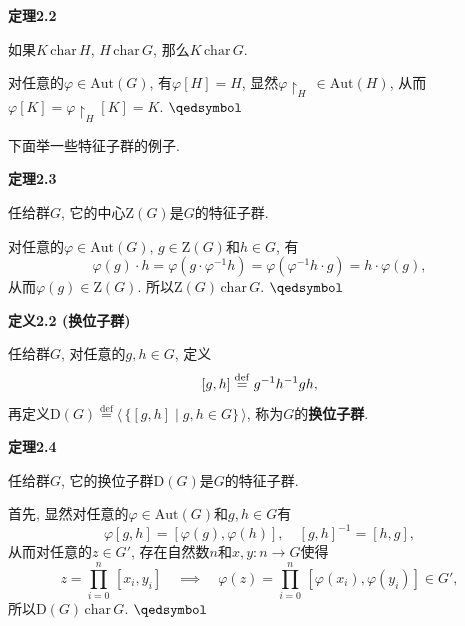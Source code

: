 \documentclass[UTF8]{ctexart}
\begin{document}
\vspace{10pt}

\hypertarget{sec:定理2.2}{}
\noindent\textbf{定理2.2}

如果$K\,\mathrm{char}\,H$, $H\,\mathrm{char}\,G$, 那么$K\,\mathrm{char}\,G$.


对任意的$\varphi\in\mathrm{Aut}(G)$, 有$\varphi[H]=H$,
显然$\varphi\!\restriction_{H}\,\in\mathrm{Aut}(H)$, 从而
$\varphi[K]=\varphi\!\restriction_{H}[K]=K$. \hfill $\qedsymbol$

\vspace{15pt}

下面举一些特征子群的例子.

\vspace{10pt}

\hypertarget{sec:定理2.3}{}
\noindent\textbf{定理2.3}

任给群$G$, 它的中心$\mathrm{Z}(G)$是$G$的特征子群.


对任意的$\varphi\in\mathrm{Aut}(G)$, $g\in\mathrm{Z}(G)$和$h\in G$, 有
\[
    \varphi(g)\cdot h=\varphi(g\cdot\varphi^{-1}h)=
    \varphi(\varphi^{-1}h\cdot g)=h\cdot\varphi(g),
\]
从而$\varphi(g)\in\mathrm{Z}(G)$. 所以$\mathrm{Z}(G)\,\mathrm{char}\,G$.
\hfill $\qedsymbol$





\newpage

\hypertarget{sec:定义2.2}{}
\noindent\textbf{定义2.2 (换位子群)}

任给群$G$, 对任意的$g,h\in G$, 定义
\vspace{-3pt}
\[
    [g,h]\overset{\mathrm{def}}{=}g^{-1}h^{-1}gh,\\[-3pt]
\]
再定义$\mathrm{D}(G)\overset{\mathrm{def}}{=}
\langle\,\{[g,h]\mid g,h\in G\}\,\rangle$, 称为$G$的\textbf{换位子群}.

\vspace{10pt}

\hypertarget{sec:定理2.4}{}
\noindent\textbf{定理2.4}

任给群$G$, 它的换位子群$\mathrm{D}(G)$是$G$的特征子群.


首先, 显然对任意的$\varphi\in\mathrm{Aut}(G)$和$g,h\in G$有
\[
    \varphi[g,h]=[\varphi(g),\varphi(h)],\quad[g,h]^{-1}=[h,g],
\]
从而对任意的$z\in G'$, 存在自然数$n$和$x,y:n\to G$使得
\vspace{3pt}
\[
    z=\prod_{i=0}^n\,[x_i,y_i]\quad\implies\quad
    \varphi(z)=\prod_{i=0}^n\,[\varphi(x_i),\varphi(y_i)]\in G',
\]
所以$\mathrm{D}(G)\,\mathrm{char}\,G$. \hfill $\qedsymbol$
\end{document}
